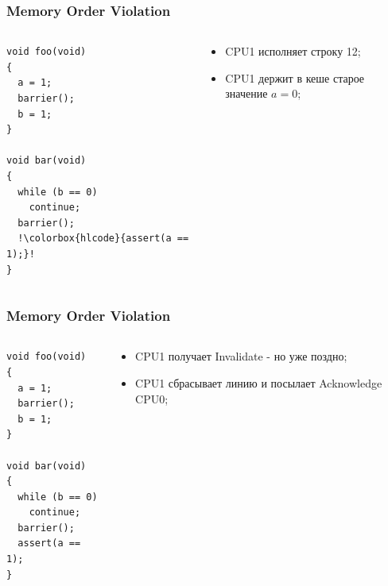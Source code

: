 \begin{frame}[fragile]
\frametitle{Memory Order Violation}

\begin{columns}[T]
  \begin{column}{.4\linewidth}
    \begin{lstlisting}[escapechar=!]
void foo(void)
{
  a = 1;
  barrier();
  b = 1;
}

void bar(void)
{
  while (b == 0)
    continue;
  barrier();
  !\colorbox{hlcode}{assert(a == 1);}!
}
    \end{lstlisting}
  \end{column}
  \begin{column}{.6\linewidth}
    \begin{itemize}
      \item CPU1 исполняет строку 12;
      \item CPU1 держит в кеше старое значение $a = 0$;
    \end{itemize}
  \end{column}
\end{columns}
\end{frame}

\begin{frame}[fragile]
\frametitle{Memory Order Violation}

\begin{columns}[T]
  \begin{column}{.4\linewidth}
    \begin{lstlisting}[escapechar=!]
void foo(void)
{
  a = 1;
  barrier();
  b = 1;
}

void bar(void)
{
  while (b == 0)
    continue;
  barrier();
  assert(a == 1);
}
    \end{lstlisting}
  \end{column}
  \begin{column}{.6\linewidth}
    \begin{itemize}
      \item CPU1 получает Invalidate - но уже поздно;
      \item CPU1 сбрасывает линию и посылает Acknowledge CPU0;
    \end{itemize}
  \end{column}
\end{columns}
\end{frame}

